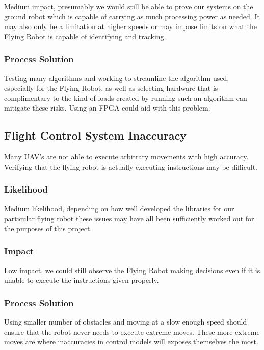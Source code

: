 \documentclass{article}
\begin{document}
		Medium impact, presumably we would still be able to prove our systems on the ground robot which is capable of carrying as much processing power as needed. It may also only be a limitation at higher speeds or may impose limits on what the Flying Robot is capable of identifying and tracking. 
		
		\subsubsection{Process Solution}
		
		Testing many algorithms and working to streamline the algorithm used, especially for the Flying Robot, as well as selecting hardware that is complimentary to the kind of loads created by running such an algorithm can mitigate these risks. Using an FPGA could aid with this problem.
	
	\subsection{Flight Control System Inaccuracy}
	
	Many UAV's are not able to execute arbitrary movements with high accuracy. Verifying that the flying robot is actually executing instructions may be difficult. 
	
		\subsubsection{Likelihood}
		
		Medium likelihood, depending on how well developed the libraries for our particular flying robot these issues may have all been sufficiently worked out for the purposes of this project.
		
		\subsubsection{Impact}
		
		Low impact, we could still observe the Flying Robot making decisions even if it is unable to execute the instructions given properly.
		
		\subsubsection{Process Solution}
		
		Using smaller number of obstacles and moving at a slow enough speed should ensure that the robot never needs to execute extreme moves. These more extreme moves are where inaccuracies in control models will exposes themselves the most. 
\end{document}
